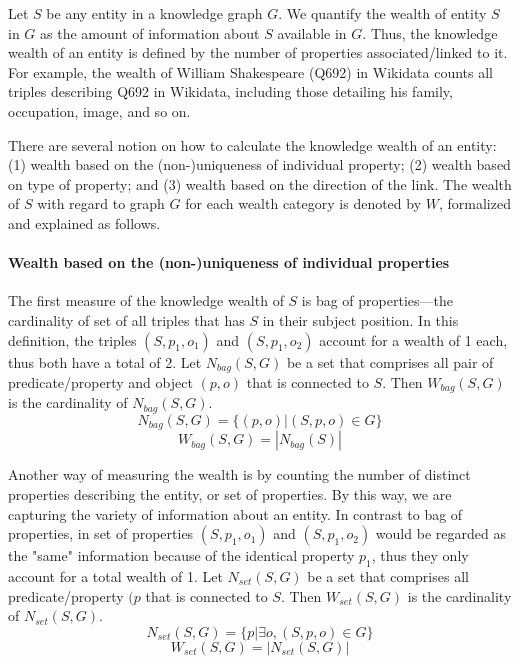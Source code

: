 \documentclass[
]{ceurart}
\begin{document}
Let \(S\) be any entity in a knowledge graph \(G\). We quantify the wealth of entity \(S\) in \(G\) as the amount of information about \(S\) available in \(G\). Thus, the knowledge wealth of an entity is defined by the number of properties associated/linked to it. For example, the wealth of William Shakespeare (Q692) in Wikidata counts all triples describing Q692 in Wikidata, including those detailing his family, occupation, image, and so on.

There are several notion on how to calculate the knowledge wealth of an entity: (1) wealth based on the (non-)uniqueness of individual property; (2) wealth based on type of property; and (3) wealth based on the direction of the link. The wealth of \(S\) with regard to graph \(G\) for each wealth category is denoted by \(W\), formalized and explained as follows.

\paragraph{Wealth based on the (non-)uniqueness of individual properties}
The first measure of the knowledge wealth of \(S\) is bag of properties---the cardinality of set of all triples that has \(S\) in their subject position. In this definition, the triples \((S, p_1, o_1)\) and \((S, p_1, o_2)\) account for a wealth of 1 each, thus both have a total of 2.
Let \(N_{bag}(S,G)\) be a set that comprises all pair of predicate/property and object \((p,o)\) that is connected to \(S\). Then \(W_{bag}(S, G)\) is the cardinality of \(N_{bag}(S,G)\).
\[
    N_{bag}(S,G) = \{(p, o) | (S, p, o) \in G\}
\]
\[
    W_{bag}(S,G) = |N_{bag}(S)|
\]

Another way of measuring the wealth is by counting the number of distinct properties describing the entity, or set of properties. By this way, we are capturing the variety of information about an entity. In contrast to bag of properties, in set of properties \((S, p_1, o_1)\) and \((S, p_1, o_2)\) would be regarded as the "same" information because of the identical property \(p_1\), thus they only account for a total wealth of 1. Let \(N_{set}(S,G)\) be a set that comprises all predicate/property \((p\) that is connected to \(S\). Then \(W_{set}(S, G)\) is the cardinality of \(N_{set}(S,G)\).
\[
    N_{set}(S, G) = \{p | \exists o, (S, p, o) \in G\}
\]
\[
    W_{set}(S, G) = |N_{set}(S,G)|
\]
\end{document}
